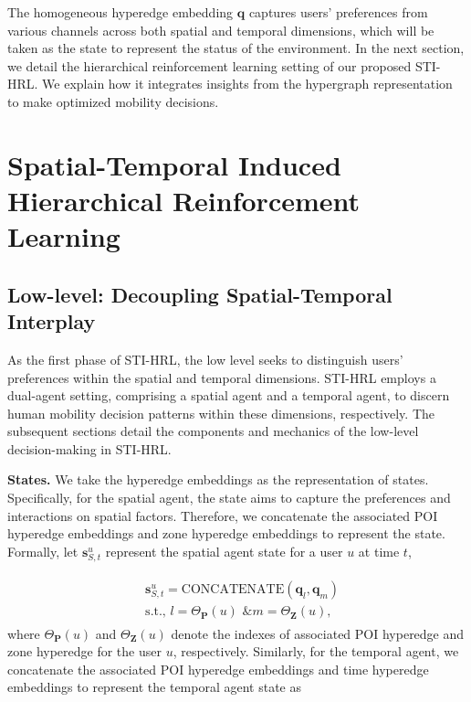 \documentclass[letterpaper]{article} %
\begin{document}
The homogeneous hyperedge embedding $\mathbf{q}$ captures users' preferences from various channels across both spatial and temporal dimensions, which will be taken as the state to represent the status of the environment.
In the next section, we detail the hierarchical reinforcement learning setting of our proposed STI-HRL.
We explain how it integrates insights from the hypergraph representation to make optimized mobility decisions.

\section{Spatial-Temporal Induced Hierarchical Reinforcement Learning}

\subsection{Low-level: Decoupling Spatial-Temporal Interplay}
As the first phase of STI-HRL, the low level seeks to distinguish users' preferences within the spatial and temporal dimensions.
STI-HRL employs a dual-agent setting, comprising a spatial agent and a temporal agent, to discern human mobility decision patterns within these dimensions, respectively. The subsequent sections detail the components and mechanics of the low-level decision-making in STI-HRL.


\noindent\textbf{States.}
We take the hyperedge embeddings as the representation of states.
Specifically, for the spatial agent, the state aims to capture the preferences and interactions on spatial factors.
Therefore, we concatenate the associated POI hyperedge embeddings and zone hyperedge embeddings to represent the state. Formally, let $\mathbf{s}^{u}_{S,t}$ represent the spatial agent state for a user $u$ at time $t$,


\begin{align}
\begin{split}
    &\mathbf{s}^{u}_{S,t} = \text{CONCATENATE} (\mathbf{q}_l, \mathbf{q}_m) \\
    &\text{s.t., }l=\Theta_{\mathbf{P}}(u) \text{ \& }
 m=\Theta_{\mathbf{Z}}(u),
 \end{split}
\end{align}
where $\Theta_{\mathbf{P}}(u)$ and $\Theta_{\mathbf{Z}}(u)$ denote the indexes of associated POI hyperedge and zone hyperedge for the user $u$, respectively.
Similarly, for the temporal agent, we concatenate the associated POI hyperedge embeddings and time hyperedge embeddings to represent the temporal agent state as
\end{document}
